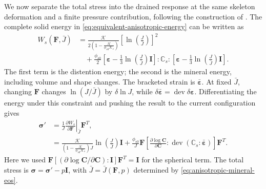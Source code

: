 \documentclass[11pt]{article}
\newcommand{\dev}{\operatorname{dev}}
\newcommand{\pder}[2]{\frac{\partial #1}{\partial #2}}
\begin{document}
We now separate the total stress into the drained response at the same
skeleton deformation and a finite pressure contribution, following the
construction of \citet[Secs.~3.4 and 3.5]{foster2026poroplastic}.
The complete solid energy in \eqref{eq:equivalent-anisotropic-energy} can be written as
\begin{align}
 W_s(\mathbf F,\bar J)
 &=\frac{\mathcal{K}}{2\left(1-\frac{\mathcal{K}}{\phi_{s0}\mathcal{K}_s}\right)}
       \left[\ln\left(\frac J{\bar J}\right)\right]^2
 \nonumber\\
 &\quad+\frac{\phi_{s0}}2
 \left[\mathbf\varepsilon-\frac13\ln\left(\frac J{\bar J}\right)\mathbf I\right]
 :\mathbb{C}_s:
 \left[\mathbf\varepsilon-\frac13\ln\left(\frac J{\bar J}\right)\mathbf I\right].
 \label{eq:coupled-solid-energy-for-stress}
\end{align}
The first term is the distention energy; the second is the mineral energy,
including volume and shape changes. The bracketed strain is
\(\bar{\mathbf\varepsilon}\). At fixed \(\bar J\), changing
\(\mathbf F\) changes \(\ln(J/\bar J)\) by \(\delta\ln J\), while
\(\delta\bar{\mathbf\varepsilon}=\dev\delta\mathbf\varepsilon\).
Differentiating the energy under this constraint and pushing the result
to the current configuration gives
\begin{align}
 \mathbf\sigma'
 &=\frac1J\left.\pder{W_s}{\mathbf F}\right|_{\bar J}\mathbf F^T,
 \label{eq:coupled-single-prime-energy-stress}\\
 &=\frac{\mathcal{K}}{\left(1-\frac{\mathcal{K}}{\phi_{s0}\mathcal{K}_s}\right) J}\ln\left(\frac J{\bar J}\right)\mathbf I
 +\frac{\phi_{s0}}J\mathbf F
 \left[\pder{\log\mathbf C}{\mathbf C}:
       \dev(\mathbb{C}_s:\bar{\mathbf\varepsilon})\right]\mathbf F^T.
 \label{eq:coupled-single-prime-explicit-stress}
\end{align}
Here we used
\(\mathbf F[(\partial\log\mathbf C/\partial\mathbf C):\mathbf I]
\mathbf F^T=\mathbf I\) for the spherical term. The total stress is
\(\mathbf\sigma=\mathbf\sigma'-p\mathbf I\), with
\(\bar J=\bar J(\mathbf F,p)\) determined by
\eqref{eq:anisotropic-mineral-eos}.
\end{document}
